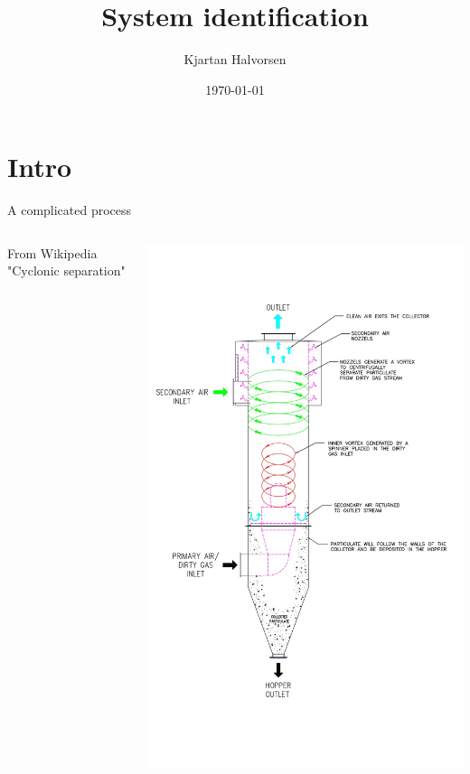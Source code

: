 \documentclass[presentation,aspectratio=169]{beamer}
\author{Kjartan Halvorsen}
\date{\today}
\title{System identification}
\begin{document}
\maketitle

\section{Intro}
\label{sec:orgcde3df2}
\begin{frame}[label={sec:orgba2bad6}]{A complicated process}
\begin{columns}
\begin{column}{0.6\columnwidth}
From Wikipedia "Cyclonic separation"
\end{column}
\begin{column}{0.4\columnwidth}
\begin{center}
\includegraphics[height=1.0\textheight]{../../figures/Vertical-cyclone.jpg}
\end{center}
\end{column}
\end{columns}
\end{frame}
\end{document}
